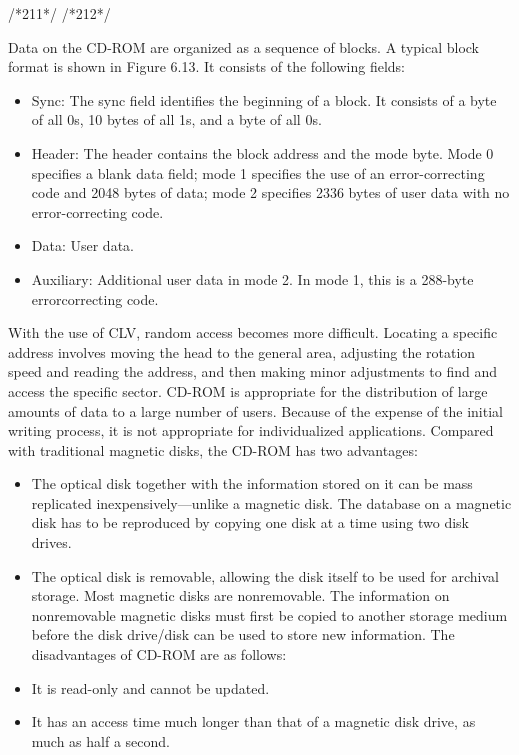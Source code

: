 /*211*/
/*212*/

Data on the CD-ROM are organized as a sequence of blocks. A typical block
format is shown in Figure 6.13. It consists of the following fields:
\begin{itemize}
\item Sync: The sync field identifies the beginning of a block. It consists of a byte of
all 0s, 10 bytes of all 1s, and a byte of all 0s.
\item Header: The header contains the block address and the mode byte. Mode
0 specifies a blank data field; mode 1 specifies the use of an error-correcting
code and 2048 bytes of data; mode 2 specifies 2336 bytes of user data with no
error-correcting code.
\item Data: User data.
\item Auxiliary: Additional user data in mode 2. In mode 1, this is a 288-byte errorcorrecting
code.
\end{itemize}
With the use of CLV, random access becomes more difficult. Locating a specific
address involves moving the head to the general area, adjusting the rotation
speed and reading the address, and then making minor adjustments to find and
access the specific sector. 
CD-ROM is appropriate for the distribution of large amounts of data to a
large number of users. Because of the expense of the initial writing process, it is not
appropriate for individualized applications. Compared with traditional magnetic
disks, the CD-ROM has two advantages:
\begin{itemize}
\item The optical disk together with the information stored on it can be mass replicated
inexpensively—unlike a magnetic disk. The database on a magnetic disk
has to be reproduced by copying one disk at a time using two disk drives.
\item The optical disk is removable, allowing the disk itself to be used for archival
storage. Most magnetic disks are nonremovable. The information on nonremovable
magnetic disks must first be copied to another storage medium
before the disk drive/disk can be used to store new information.
The disadvantages of CD-ROM are as follows:
\item It is read-only and cannot be updated.
\item It has an access time much longer than that of a magnetic disk drive, as much
as half a second.
\end{itemize} 
